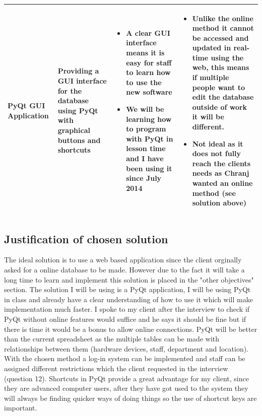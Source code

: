 \begin{center}
\begin{longtable}{|p{2.5cm}|p{3cm}|p{3.2cm}|p{3.2cm}|}
PyQt GUI Application &		 Providing a GUI interface for the database using PyQt with graphical buttons and shortcuts & 		\begin{itemize} \item A clear GUI interface means it is easy for staff to learn how to use the new software \item We will be learning how to program with PyQt in lesson time and I have been using it since July 2014   \end{itemize} & 		 \begin{itemize} \item Unlike the online method it cannot be accessed and updated in real-time using the web, this means if multiple people want to edit the database outside of work it will be different. \item Not ideal as it does not fully reach the clients needs as Chranj wanted an online method (see solution above) \end{itemize} \\
 \hline
\end{longtable}
\end{center}


\subsection{Justification of chosen solution}

The ideal solution is to use a web based application since the client orginally asked for a online database to be made. However due to the fact it will take a long time to learn and implement this solution is placed in the "other objectives" section. The solution I will be using is a PyQt application, I will be using PyQt in class and already have a clear understanding of how to use it which will make implementation much faster. I spoke to my client after the interview to check if PyQt without online features would suffice and he says it should be fine but if there is time it would be a bonus to allow online connections. PyQt will be better than the current spreadsheet as the multiple tables can be made with relationships between them (hardware devices, staff, department and location). With the chosen method a log-in system can be implemented and staff can be assigned different restrictions which the client requested in the interview (question 12). Shortcuts in PyQt provide a great advantage for my client, since they are advanced computer users, after they have got used to the system they will always be finding quicker ways of doing things so the use of shortcut keys are important.